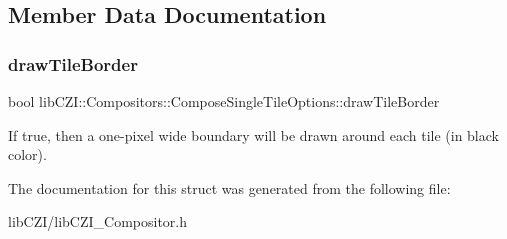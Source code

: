 \subsection{Member Data Documentation}
\mbox{\label{structlib_c_z_i_1_1_compositors_1_1_compose_single_tile_options_a9d4799bf8b8a0a89c50506f3a0af4cb2}} 
\subsubsection{\texorpdfstring{draw\+Tile\+Border}{drawTileBorder}}
{\footnotesize\ttfamily bool lib\+C\+Z\+I\+::\+Compositors\+::\+Compose\+Single\+Tile\+Options\+::draw\+Tile\+Border}

If true, then a one-\/pixel wide boundary will be drawn around each tile (in black color). 

The documentation for this struct was generated from the following file\+:\begin{DoxyCompactItemize}
\item 
lib\+C\+Z\+I/lib\+C\+Z\+I\+\_\+\+Compositor.\+h\end{DoxyCompactItemize}
